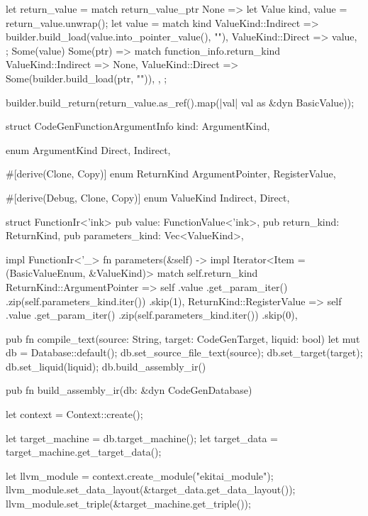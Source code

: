 \documentclass[
  oneside,
  english,
  coorientadorbanca,
  noabntexcite
]{ufsc-thesis-rn46-2019}
\begin{document}
\begin{rustcode}
{{        let return_value = match return_value_ptr {
            None => {
                let Value { kind, value } = return_value.unwrap();
                let value = match kind {
                    ValueKind::Indirect => builder.build_load(value.into_pointer_value(), ""),
                    ValueKind::Direct => value,
                };
                Some(value)
            }
            Some(ptr) => match function_info.return_kind {
                ValueKind::Indirect => None,
                ValueKind::Direct => Some(builder.build_load(ptr, "")),
            },
        };

        builder.build_return(return_value.as_ref().map(|val| val as &dyn BasicValue));
    }
}

struct CodeGenFunctionArgumentInfo {
    kind: ArgumentKind,
}

enum ArgumentKind {
    Direct,
    Indirect,
}

#[derive(Clone, Copy)]
enum ReturnKind {
    ArgumentPointer,
    RegisterValue,
}

#[derive(Debug, Clone, Copy)]
enum ValueKind {
    Indirect,
    Direct,
}

struct FunctionIr<'ink> {
    pub value: FunctionValue<'ink>,
    pub return_kind: ReturnKind,
    pub parameters_kind: Vec<ValueKind>,
}

impl FunctionIr<'_> {
    fn parameters(&self) -> impl Iterator<Item = (BasicValueEnum, &ValueKind)> {
        match self.return_kind {
            ReturnKind::ArgumentPointer => self
                .value
                .get_param_iter()
                .zip(self.parameters_kind.iter())
                .skip(1),
            ReturnKind::RegisterValue => self
                .value
                .get_param_iter()
                .zip(self.parameters_kind.iter())
                .skip(0),
        }
    }
}

pub fn compile_text(source: String, target: CodeGenTarget, liquid: bool) {
    let mut db = Database::default();
    db.set_source_file_text(source);
    db.set_target(target);
    db.set_liquid(liquid);
    db.build_assembly_ir()
}

pub fn build_assembly_ir(db: &dyn CodeGenDatabase) {
    let context = Context::create();

    let target_machine = db.target_machine();
    let target_data = target_machine.get_target_data();

    let llvm_module = context.create_module("ekitai_module");
    llvm_module.set_data_layout(&target_data.get_data_layout());
    llvm_module.set_triple(&target_machine.get_triple());

}
\end{rustcode}
\end{document}
